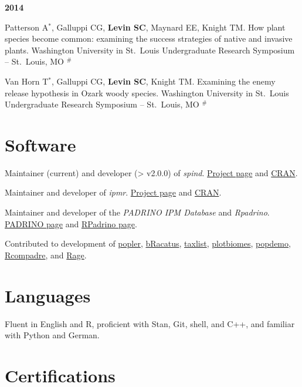 \documentclass[11pt,]{article}
\begin{document}
\textbf{2014}

Patterson A\(^\ast\), Galluppi CG, \textbf{Levin SC}, Maynard EE, Knight
TM. How plant species become common: examining the success strategies of
native and invasive plants. Washington University in St.~Louis
Undergraduate Research Symposium -- St.~Louis, MO \(^\#\)

Van Horn T\(^\ast\), Galluppi CG, \textbf{Levin SC}, Knight TM.
Examining the enemy release hypothesis in Ozark woody species.
Washington University in St.~Louis Undergraduate Research Symposium --
St.~Louis, MO \(^\#\)

\hypertarget{software}{%
\section{Software}\label{software}}

Maintainer (current) and developer (\textgreater{} v2.0.0) of
\emph{spind}. \href{https://github.com/levisc8/spind}{Project page} and
\href{https://cran.r-project.org/package=spind}{CRAN}.

Maintainer and developer of \emph{ipmr}.
\href{https://padrinoDB.github.io/ipmr/}{Project page} and
\href{https://cran.r-project.org/package=ipmr}{CRAN}.

Maintainer and developer of the \emph{PADRINO IPM Database} and
\emph{Rpadrino}. \href{https://padrinoDB.github.io/Padrino/}{PADRINO
page} and \href{https://padrinoDB.github.io/RPadrino/}{RPadrino page}.

Contributed to development of
\href{https://github.com/ropensci/popler}{popler},
\href{https://github.com/EduardoArle/bRacatus}{bRacatus},
\href{https://github.com/ropensci/taxlist}{taxlist},
\href{https://github.com/valentinitnelav/plotbiomes}{plotbiomes},
\href{https://github.com/iainmstott/popdemo}{popdemo},
\href{https://github.com/jonesor/Rcompadre}{Rcompadre}, and
\href{https://github.com/jonesor/Rage}{Rage}.

\hypertarget{languages}{%
\section{Languages}\label{languages}}

Fluent in English and R, proficient with Stan, Git, shell, and C++, and
familiar with Python and German.

\hypertarget{certifications}{%
\section{Certifications}\label{certifications}}
\end{document}
